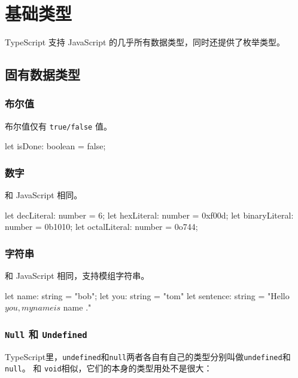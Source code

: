 \section{基础类型}

TypeScript 支持 JavaScript 的几乎所有数据类型，同时还提供了枚举类型。

\subsection{固有数据类型}

\subsubsection*{布尔值}

布尔值仅有 \texttt{true/false} 值。

\begin{TypeScript}
let isDone: boolean = false;
\end{TypeScript}

\subsubsection*{数字}

和 JavaScript 相同。

\begin{TypeScript}
let decLiteral: number = 6;
let hexLiteral: number = 0xf00d;
let binaryLiteral: number = 0b1010;
let octalLiteral: number = 0o744;
\end{TypeScript}

\subsubsection*{字符串}

和 JavaScript 相同，支持模组字符串。

\begin{TypeScript}
let name: string = "bob";
let you: string = "tom"
let sentence: string = "Hello ${ you }, my name is ${ name }."
\end{TypeScript}

\subsubsection*{\texttt{Null} 和 \texttt{Undefined}}

TypeScript里，\texttt{undefined}和\texttt{null}两者各自有自己的类型分别叫做\texttt{undefined}和\texttt{null}。 和 \texttt{void}相似，它们的本身的类型用处不是很大：

